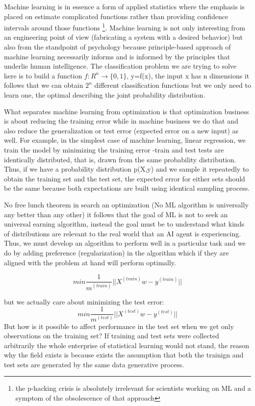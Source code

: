 \documentclass[12pt]{report}
\begin{document}
Machine learning is in essence a form of applied statistics where the emphasis is placed on estimate complicated functions rather than providing confidence intervals around those functions \footnote{the p-hacking crisis is absolutely irrelevant for scientists working on ML and a symptom of the obsolescence of that approach}. Machine learning is not only interesting from an engineering point of view (fabricating a system with a desired behavior) but also from the standpoint of psychology because principle-based approach of machine learning necessarily informs and is informed by the principles that underlie human intelligence.
The classification problem we are trying to solve here is to build a function $f:R^n \to \{0,1\}$, y=f(x), the input x has n dimensions it follows that we can obtain $2^n$ different classification functions  but we only need to learn one, the optimal describing the joint probability distribution.

What separates machine learning from optimization is that optimization business is about reducing the training error  while in machine business we do that and also reduce the generalization or test error (expected error on a new input) as well. For example, in the simplest case of machine learning, linear regression, we train the model by minimizing the training error -train and test tests are identically distributed, that is, drawn from the same probability distribution. Thus, if we have a probability distribution p(X,y) and we sample it repeatedly to obtain the training set and the test set, the expected error for either sets should be the same because both expectations are built using identical sampling process.

No free lunch theorem in search an optimization \cite{wolpert1997no} (No ML algorithm is universally any better than any other) it follows that the goal of ML is not to seek an universal earning algorithm, instead the goal must be to understand what kinds of distributions are relevant to the real world that an AI agent is experiencing. Thus, we must develop an algorithm to perform well in a particular task and we do by adding preference (regularization) in the algorithm which if they are aligned with the problem at hand will perform optimally.


\begin{equation}
min \frac{1}{m^{(train)}} ||X^{(train)}w - y^{(train)}||
\end{equation}

but we actually care about minimizing the test error:
\begin{equation}
min \frac{1}{m^{(test)}} ||X^{(test)}w - y^{(test)}||
\end{equation}
But how is it possible to affect performance in the test set when we get only observations on the training set? If training and test sets were collected arbitrarily the whole enterprise of statistical learning would not stand, the reason why the field exists is because exists the assumption that both the trainign and test sets are generated by the same data generative process.
\end{document}
